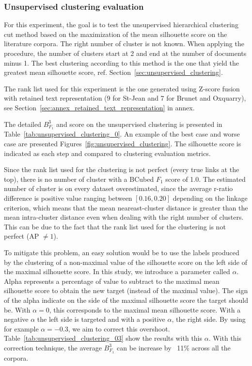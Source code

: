 \subsubsection{Unsupervised clustering evaluation}

For this experiment, the goal is to test the unsupervised hierarchical clustering cut method based on the maximization of the mean silhouette score on the literature corpora.
The right number of cluster is not known.
When applying the procedure, the number of clusters start at 2 and end at the number of documents minus 1.
The best clustering according to this method is the one that yield the greatest mean silhouette score, ref. Section~\ref{sec:unsupervised_clustering}.

The rank list used for this experiment is the one generated using Z-score fusion with retained text representation (9 for St-Jean and 7 for Brunet and Oxquarry), see Section~\ref{sec:annex_retained_text_representation} in annex.

The detailed $B^3_{F_1}$ and score on the unsupervised clustering is presented in Table~\ref{tab:unsupervised_clustering_0}.
An example of the best case and worse case are presented Figures~\ref{fig:unsupervised_clustering}.
The silhouette score is indicated as each step and compared to clustering evaluation metrics.

Since the rank list used for the clustering is not perfect (every true links at the top), there is no number of cluster with a BCubed $F_1$ score of 1.0.
The estimated number of cluster is on every dataset overestimated, since the average r-ratio difference is positive value ranging between $\left[0.16, 0.20\right]$ depending on the linkage criterion, which means that the mean neareast-cluster distance is greater than the mean intra-cluster distance even when dealing with the right number of clusters.
This can be due to the fact that the rank list used for the clustering is not perfect (AP $\neq 1$).

To mitigate this problem, an easy solution would be to use the labels produced by the clustering of a non-maximal value of the silhouette score on the left side of the maximal silhouette score.
In this study, we introduce a parameter called $\alpha$. Alpha represents a percentage of value to subtract to the maximal mean silhouette score to obtain the new target (instead of the maximal value).
The sign of the alpha indicate on the side of the maximal silhouette score the target should be.
With $\alpha = 0$, this corresponds to the maximal mean silhouette score.
With a negative $\alpha$ the left side is targeted and with a positive $\alpha$, the right side.
By using for example $\alpha = -0.3$, we aim to correct this overshoot.
Table~\ref{tab:unsupervised_clustering_03} show the results with this $\alpha$.
With this correction technique, the average $B^3_{F_1}$ can be increase by ~11\% across all the corpora.

